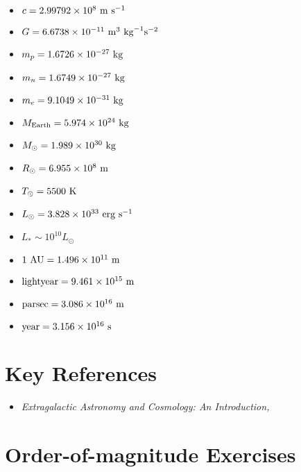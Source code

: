 \begin{itemize}
\item $c = 2.99792 \times 10^8  {\rm ~m} {\rm ~s}^{-1} $
\item $G = 6.6738 \times 10^{-11} {\rm ~m}^3 {\rm ~kg}^{-1} {\rm s}^{-2} $
\item $m_p =  1.6726 \times 10^{-27} {\rm ~kg} $
\item $m_n =  1.6749 \times 10^{-27} {\rm ~kg} $
\item $m_e =  9.1049 \times 10^{-31} {\rm ~kg} $
\item $M_{\rm Earth} = 5.974 \times 10^{24} {\rm ~kg} $
\item $M_{\odot} = 1.989 \times 10^{30} {\rm ~kg} $
\item $R_{\odot} = 6.955 \times 10^{8} {\rm ~m} $
\item $T_{\odot} = 5500 {\rm ~K} $
\item $L_{\odot} = 3.828 \times 10^{33} {\rm ~erg} {\rm ~s}^{-1}$
\item $L_{\ast} \sim 10^{10} L_{\odot} $
\item ${\rm 1~AU} = 1.496 \times 10^{11} {\rm ~m} $
\item ${\rm lightyear} = 9.461 \times 10^{15} {\rm ~m} $
\item ${\rm parsec} = 3.086 \times 10^{16} {\rm ~m} $
\item ${\rm year} = 3.156 \times 10^{16} {\rm ~s} $
\end{itemize}

\section{Key References}

\begin{itemize}
  \item {\it Extragalactic Astronomy and Cosmology: An Introduction,
    \citet{schneider15a}}
\end{itemize}

\section{Order-of-magnitude Exercises}

